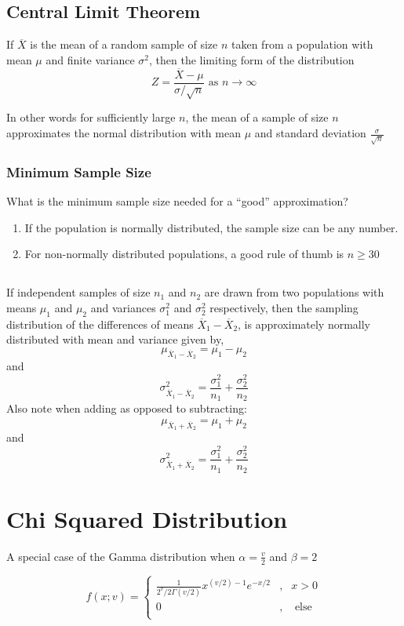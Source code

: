 \documentclass{book}
\begin{document}
\subsection{Central Limit Theorem}
If $\overline X$ is the mean of a random sample of size $n$ taken from a population with mean $\mu$ and finite variance $\sigma^2$, then the limiting form of the distribution
$$Z=\frac{\overline X - \mu}{\sigma/\sqrt{n}} \text{ as } n \rightarrow \infty$$

In other words for sufficiently large $n$, the mean of a sample of size $n$ approximates the normal distribution with mean $\mu$ and standard deviation $\frac{\sigma}{\sqrt{n}}$

\subsubsection{Minimum Sample Size}
What is the minimum sample size needed for a \enquote{good} approximation?
\begin{enumerate}
\item If the population is normally distributed, the sample size can be any number.
\item For non-normally distributed populations, a good rule of thumb is $n \ge 30$
\end{enumerate}

\subsection{}
If independent samples of size $n_1$ and $n_2$ are drawn from two populations with means $\mu_1$ and $\mu_2$ and variances $\sigma_1^2$ and $\sigma_2^2$ respectively, then the sampling distribution of the differences of means $\overline X_1 - \overline X_2$, is approximately normally distributed with mean and variance given by,
$$\mu_{\overline X_1-\overline X_2}=\mu_1 - \mu_2$$
and
$$\sigma^2_{\overline X_1-\overline X_2}=\frac{\sigma_1^2}{n_1}+\frac{\sigma_2^2}{n_2}$$
Also note when adding as opposed to subtracting:
$$\mu_{\overline X_1+\overline X_2}=\mu_1 + \mu_2$$
and
$$\sigma^2_{\overline X_1+\overline X_2}=\frac{\sigma_1^2}{n_1}+\frac{\sigma_2^2}{n_2}$$

\section{Chi Squared Distribution}
A special case of the Gamma distribution when $\alpha=\frac{v}{2}$ and $\beta=2$

$$
f(x;v) = \left \{ 
\begin{matrix}
\frac{1}{2^v/2 \Gamma(v/2)}x^{(v/2) - 1}e^{-x/2} & ,& x > 0\\
0 & ,& \text{ else }\\
\end{matrix}
\right .
$$
\end{document}
